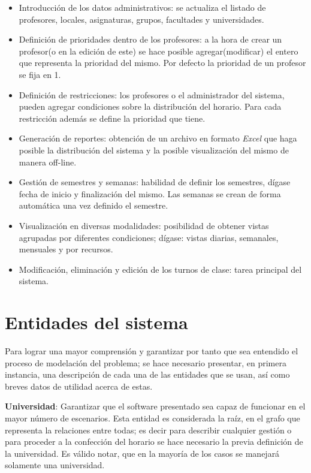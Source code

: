\begin{itemize}
	\item Introducción de los datos administrativos: se actualiza el listado de profesores, locales, asignaturas, grupos, facultades y universidades.
	\item Definición de prioridades dentro de los profesores: a la hora de crear un profesor(o en la edición de este) se hace posible agregar(modificar) el entero que representa la prioridad del mismo. Por defecto la prioridad de un profesor se fija en 1.
	\item Definición de restricciones: los profesores o el administrador del sistema, pueden agregar condiciones sobre la distribución del horario. Para cada restricción además se define la prioridad que tiene. 
	\item Generación de reportes: obtención de un archivo en formato \textit{Excel} que haga posible la distribución del sistema y la posible visualización del mismo de manera off-line.
	\item Gestión de semestres y semanas: habilidad de definir los semestres, dígase fecha de inicio y finalización del mismo. Las semanas se crean de forma automática una vez definido el semestre.
	\item Visualización en diversas modalidades: posibilidad de obtener vistas agrupadas por diferentes condiciones; dígase: vistas diarias, semanales, mensuales y por recursos.
	\item Modificación, eliminación y edición de los turnos de clase: tarea principal del sistema.
\end{itemize}

\section{Entidades del sistema}
\label{sec:entities}

Para lograr una mayor comprensión y garantizar por tanto que sea entendido el proceso de modelación del problema; se hace necesario presentar, en primera instancia, una descripción de cada una de las entidades que se usan, así como breves datos de utilidad acerca de estas.

\textbf{Universidad}: Garantizar que el software presentado sea capaz de funcionar en el mayor número de escenarios. Esta entidad es considerada la raíz, en el grafo que representa la relaciones entre todas; es decir para describir cualquier gestión o para proceder a la confección del horario se hace necesario la previa definición de la universidad. Es válido notar, que en la mayoría de los casos se manejará solamente  una universidad.

